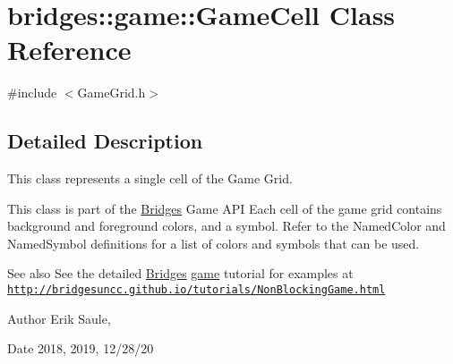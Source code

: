 \hypertarget{classbridges_1_1game_1_1_game_cell}{}\section{bridges\+:\+:game\+:\+:Game\+Cell Class Reference}
\label{classbridges_1_1game_1_1_game_cell}


{\ttfamily \#include $<$Game\+Grid.\+h$>$}



\subsection{Detailed Description}
This class represents a single cell of the Game Grid. 

This class is part of the \hyperlink{classbridges_1_1_bridges}{Bridges} Game A\+PI Each cell of the game grid contains background and foreground colors, and a symbol. Refer to the Named\+Color and Named\+Symbol definitions for a list of colors and symbols that can be used.

\begin{DoxySeeAlso}{See also}
See the detailed \hyperlink{classbridges_1_1_bridges}{Bridges} \hyperlink{namespacebridges_1_1game}{game} tutorial for examples at \href{http://bridgesuncc.github.io/tutorials/NonBlockingGame.html}{\tt http\+://bridgesuncc.\+github.\+io/tutorials/\+Non\+Blocking\+Game.\+html}
\end{DoxySeeAlso}
\begin{DoxyAuthor}{Author}
Erik Saule, 
\end{DoxyAuthor}
\begin{DoxyDate}{Date}
2018, 2019, 12/28/20 
\end{DoxyDate}
